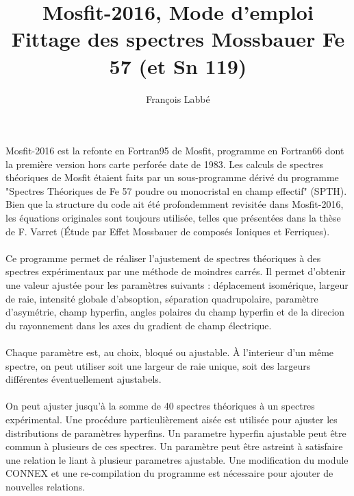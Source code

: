 \documentclass[a4paper]{article}
\begin{document}
\title{Mosfit-2016, Mode d'emploi \\Fittage des spectres Mossbauer Fe 57 (et Sn 119)}
\author{Fran\c{c}ois Labb\'e}
\maketitle

\paragraph{}
Mosfit-2016 est la refonte en Fortran95 de Mosfit, programme en Fortran66 dont la première version hors carte perforée date de 1983.
Les calculs de spectres théoriques de Mosfit étaient faits par un sous-programme dérivé du programme "Spectres Théoriques de Fe 57 poudre ou monocristal en champ effectif" (SPTH). 
Bien que la structure du code ait été profondemment revisitée dans Mosfit-2016, les équations originales sont toujours utilisée, telles que présentées dans la thèse de F. Varret (\'Etude par Effet Mossbauer de composés Ioniques et Ferriques).


\paragraph{}
Ce programme permet de réaliser l'ajustement de spectres théoriques à des spectres expérimentaux par une méthode de moindres carrés.
Il permet d'obtenir une valeur ajustée pour les paramètres suivants : déplacement isomérique, largeur de raie, intensité globale d'absoption, 
séparation quadrupolaire, paramètre d'asymétrie, champ hyperfin, angles polaires du champ hyperfin et de la direcion du rayonnement dans les axes du gradient de champ électrique.

\paragraph{}
Chaque paramètre est, au choix, bloqué ou ajustable. À l'interieur d'un même spectre, on peut utiliser soit une largeur de raie unique, soit des largeurs différentes éventuellement ajustabels. 

\paragraph{}
On peut ajuster jusqu'à la somme de 40 spectres théoriques à un spectres expérimental.
 Une procédure particulièrement aisée est utilisée pour ajuster les distributions de paramètres hyperfins.
 Un parametre hyperfin ajustable peut être commun à plusieurs de ces spectres. Un paramètre peut être astreint à satisfaire une relation le liant à plusieur parametres ajustable.
 Une modification du module CONNEX et une re-compilation du programme est nécessaire pour ajouter de nouvelles relations.
 
\end{document}
